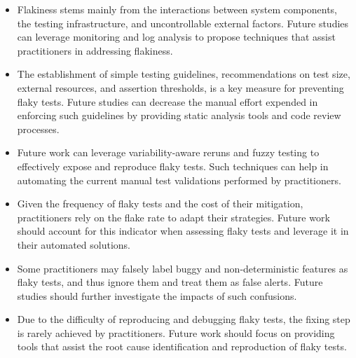 \begin{itemize}[wide=10pt,noitemsep,topsep=0pt]
    \item Flakiness stems mainly from the interactions between system components, the testing infrastructure, and uncontrollable external factors. 
    Future studies can leverage monitoring and log analysis to propose techniques that assist practitioners in addressing flakiness.
    
    \item The establishment of simple testing guidelines, \eg recommendations on test size, external resources, and assertion thresholds, is a key measure for preventing flaky tests.
    Future studies can decrease the manual effort expended in enforcing such guidelines by providing static analysis tools and code review processes.
    
    \item Future work can leverage variability-aware reruns \cite{WongMLK18} and fuzzy testing to effectively expose and reproduce flaky tests.
    Such techniques can help in automating the current manual test validations performed by practitioners.
    
    \item Given the frequency of flaky tests and the cost of their mitigation, practitioners rely on the flake rate to adapt their strategies.
    Future work should account for this indicator when assessing flaky tests and leverage it in their automated solutions.
    
    
    \item Some practitioners may falsely label buggy and non-deterministic features as flaky tests, and thus ignore them and treat them as false alerts.
    Future studies should further investigate the impacts of such confusions.
    
    \item Due to the difficulty of reproducing and debugging flaky tests, the fixing step is rarely achieved by practitioners. 
    Future work should focus on providing tools that assist the root cause identification and reproduction of flaky tests.
    
\end{itemize}